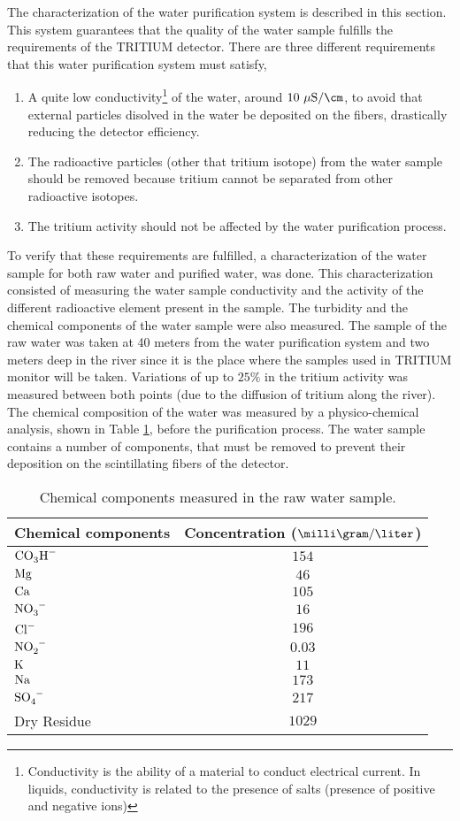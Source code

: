 The characterization of the water purification system is described in this section. This system guarantees that the quality of the water sample fulfills the requirements of the TRITIUM detector. There are three different requirements that this water purification system must satisfy,

\begin{enumerate}
\item{} A quite low conductivity\footnote{Conductivity is the ability of a material to conduct electrical current. In liquids, conductivity is related to the presence of salts (presence of positive and negative ions)} of the water, around $10~\mu\text{S}/\cm$, to avoid that external particles disolved in the water be deposited on the fibers, drastically reducing the detector efficiency.

\item{} The radioactive particles (other that tritium isotope) from the water sample should be removed because tritium cannot be separated from other radioactive isotopes.

\item{} The tritium activity should not be affected by the water purification process. 

\end{enumerate}

To verify that these requirements are fulfilled, a characterization of the water sample for both raw water and purified water, was done. This characterization consisted of measuring the water sample conductivity and the activity of the different radioactive element present in the sample. The turbidity and the chemical components of the water sample were also measured. The sample of the raw water was taken at 40 meters from the water purification system and two meters deep in the river since it is the place where the samples used in TRITIUM monitor will be taken. Variations of up to $25\%$ in the tritium activity was measured between both points (due to the diffusion of tritium along the river). The chemical composition of the water was measured by a physico-chemical analysis, shown in Table \ref{tab:ChemicalComponentsRawWater}, before the purification process. The water sample contains a number of components, that must be removed to prevent their deposition on the scintillating fibers of the detector.


\begin{table}[htbp]
\centering{}%
\begin{tabular}{lc}
\toprule 
Chemical components & Concentration ($\milli\gram/\liter$) \tabularnewline
\midrule
\midrule 
$\ce{CO_{3}H^-}$ & $154$ \tabularnewline
$\ce{Mg}$ & $46$ \tabularnewline
$\ce{Ca}$ & $105$ \tabularnewline
$\ce{NO_{3}^-}$ & $16$ \tabularnewline
$\ce{Cl^-}$ & $196$ \tabularnewline
$\ce{NO_{2}^-}$ & $0.03$ \tabularnewline
$\ce{K}$ & $11$ \tabularnewline
$\ce{Na}$ & $173$ \tabularnewline
$\ce{SO_{4}^-}$ & $217$ \tabularnewline
Dry Residue & $1029$ \tabularnewline
\bottomrule
\end{tabular}
\caption{Chemical components measured in the raw water sample.}
\label{tab:ChemicalComponentsRawWater}
\end{table}

